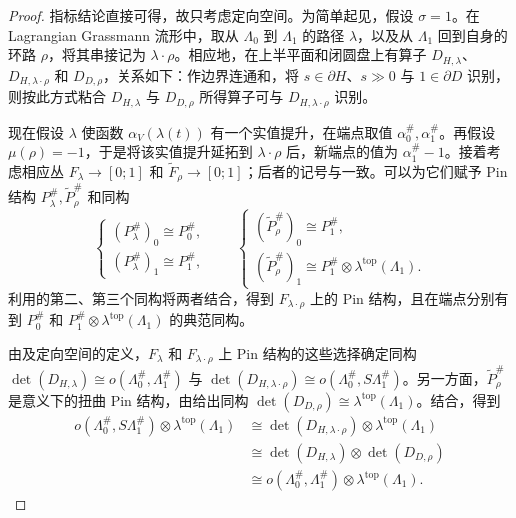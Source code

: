\begin{proof}
指标结论直接可得，故只考虑定向空间。为简单起见，假设 $\sigma=1$。在 Lagrangian Grassmann 流形中，取从 $\Lambda_0$ 到 $\Lambda_1$ 的路径 $\lambda$，以及从 $\Lambda_1$ 回到自身的环路 $\rho$，将其串接记为 $\lambda\cdot\rho$。相应地，在上半平面和闭圆盘上有算子 $D_{H,\allowbreak \lambda}$、$D_{H,\allowbreak \lambda\cdot\rho}$ 和 $D_{D,\allowbreak \rho}$，关系如下：作边界连通和，将 $s\in\partial H$、$s\gg0$ 与 $1\in\partial D$ 识别，则按此方式粘合 $D_{H,\allowbreak \lambda}$ 与 $D_{D,\allowbreak \rho}$ 所得算子可与 $D_{H,\allowbreak \lambda\cdot\rho}$ 识别。

现在假设 $\lambda$ 使函数 $\alpha_V(\lambda(t))$ 有一个实值提升，在端点取值 $\alpha_0^\#,\allowbreak \alpha_1^\#$。再假设 $\mu(\rho)=-1$，于是将该实值提升延拓到 $\lambda\cdot\rho$ 后，新端点的值为 $\alpha_1^\#-1$。接着考虑相应丛 $F_\lambda\to[0;1]$ 和 $\widetilde F_\rho\to[0;1]$；后者的记号与一致。可以为它们赋予 Pin 结构 $P_\lambda^\#,\allowbreak \widetilde P_\rho^\#$ 和同构
\begin{equation}\label{eq:11.38}
\begin{cases}(P_\lambda^\#)_0\cong P_0^\#,\\(P_\lambda^\#)_1\cong P_1^\#,
\end{cases}\qquad
\begin{cases}(\widetilde P_\rho^\#)_0\cong P_1^\#,\\(\widetilde P_\rho^\#)_1\cong P_1^\#\otimes\lambda^{\mathrm{top}}(\Lambda_1).
\end{cases}
\end{equation}
利用的第二、第三个同构将两者结合，得到 $F_{\lambda\cdot\rho}$ 上的 Pin 结构，且在端点分别有到 $P_0^\#$ 和 $P_1^\#\otimes\lambda^{\mathrm{top}}(\Lambda_1)$ 的典范同构。

由及定向空间的定义，$F_\lambda$ 和 $F_{\lambda\cdot\rho}$ 上 Pin 结构的这些选择确定同构 $\det(D_{H,\allowbreak \lambda})\cong o(\Lambda_0^\#,\allowbreak \Lambda_1^\#)$ 与 $\det(D_{H,\allowbreak \lambda\cdot\rho})\cong o(\Lambda_0^\#,\allowbreak S\Lambda_1^\#)$。另一方面，$\widetilde P_\rho^\#$ 是意义下的扭曲 Pin 结构，由给出同构 $\det(D_{D,\allowbreak \rho})\cong\lambda^{\mathrm{top}}(\Lambda_1)$。结合，得到
\[
\begin{aligned}
o(\Lambda_0^\#,S\Lambda_1^\#)\otimes\lambda^{\mathrm{top}}(\Lambda_1)
&\cong\det(D_{H,\lambda\cdot\rho})\otimes\lambda^{\mathrm{top}}(\Lambda_1)\\
&\cong\det(D_{H,\lambda})\otimes\det(D_{D,\rho})\\
&\cong o(\Lambda_0^\#,\Lambda_1^\#)\otimes\lambda^{\mathrm{top}}(\Lambda_1).
\end{aligned}
\]
\end{proof}
